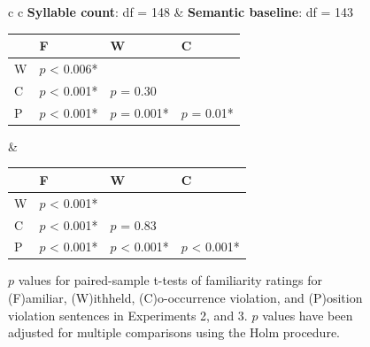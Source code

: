 \documentclass[man,floatsintext]{apa6}
\begin{document}
\begin{figure}[h]
\begin{center}
\begin{tabular}{ c c}
      \textbf{Syllable count}: df = 148 & \textbf{Semantic baseline}: df = 143 \\




      {
      \small
      \begin{tabular}{| l | l |  l | l |}
        \hline
        & F                           & W                         & C \\
        \hline
        W &  $p$ < 0.006*  &                           &\\
        \hline
        C &  $p$ < 0.001*  &  $p$ = 0.30  &\\
        \hline
        P &  $p$ < 0.001* &  $p$ = 0.001*  &  $p$ = 0.01*\\
        \hline
      \end{tabular}
      } &




          {
          \small
          \begin{tabular}{| l | l |  l | l |}
            \hline
            & F                            & W                         & C \\
            \hline
            W &  $p$ < 0.001*  &                           &\\
            \hline
            C &  $p$ < 0.001*  &  $p$ = 0.83   &\\
            \hline
            P &  $p$ < 0.001* &  $p$ < 0.001*  &  $p$ < 0.001*\\
            \hline
          \end{tabular}
      }

    \end{tabular}
    \caption{$p$ values for paired-sample t-tests of familiarity ratings for (F)amiliar, (W)ithheld, (C)o-occurrence violation, and (P)osition violation sentences in Experiments 2, and 3. $p$ values have been adjusted for multiple comparisons using the Holm procedure.}
    \label{familiarity-ordering-t-tests-23}
  \end{center}
\end{figure}
\end{document}
